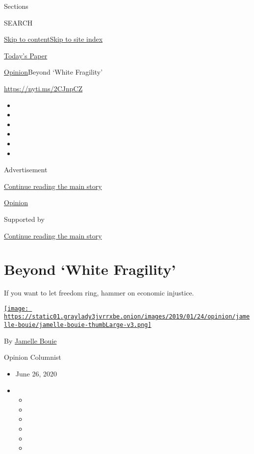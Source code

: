 Sections

SEARCH

\protect\hyperlink{site-content}{Skip to
content}\protect\hyperlink{site-index}{Skip to site index}

\href{https://myaccount.nytimes3xbfgragh.onion/auth/login?response_type=cookie\&client_id=vi}{}

\href{https://www.nytimes3xbfgragh.onion/section/todayspaper}{Today's
Paper}

\href{/section/opinion}{Opinion}\textbar{}Beyond `White Fragility'

\href{https://nyti.ms/2CJnpCZ}{https://nyti.ms/2CJnpCZ}

\begin{itemize}
\item
\item
\item
\item
\item
\item
\end{itemize}

Advertisement

\protect\hyperlink{after-top}{Continue reading the main story}

\href{/section/opinion}{Opinion}

Supported by

\protect\hyperlink{after-sponsor}{Continue reading the main story}

\hypertarget{beyond-white-fragility}{%
\section{Beyond `White Fragility'}\label{beyond-white-fragility}}

If you want to let freedom ring, hammer on economic injustice.

\href{https://www.nytimes3xbfgragh.onion/column/jamelle-bouie}{\texttt{[image: https://static01.graylady3jvrrxbe.onion/images/2019/01/24/opinion/jamelle-bouie/jamelle-bouie-thumbLarge-v3.png]}}

By
\href{https://www.nytimes3xbfgragh.onion/column/jamelle-bouie}{Jamelle
Bouie}

Opinion Columnist

\begin{itemize}
\item
  June 26, 2020
\item
  \begin{itemize}
  \item
  \item
  \item
  \item
  \item
  \item
  \end{itemize}
\end{itemize}

